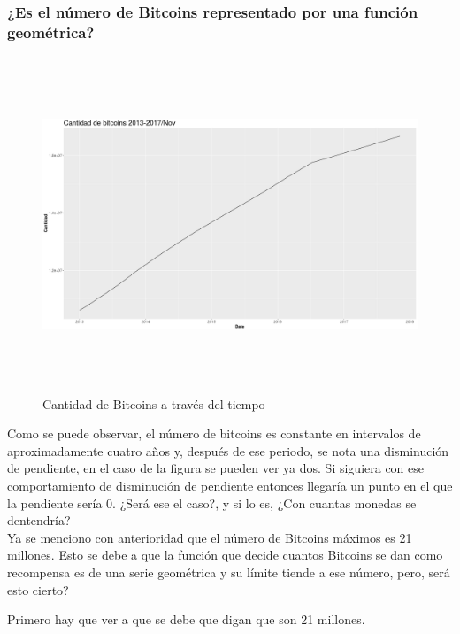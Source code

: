 \documentclass[12pt,letterpaper]{article}
\begin{document}
    \subsubsection*{¿Es el número de Bitcoins representado por una función geom\'etrica?}

    \begin{figure}
        \centering

        \includegraphics[width = 18cm, height = 10cm]{btc/fecha_vs_cantidad}

        \caption{Cantidad de Bitcoins a trav\'es del tiempo}
    \end{figure}

    Como se puede observar, el n\'umero de bitcoins es constante en intervalos de aproximadamente cuatro a\~nos y, despu\'es de ese periodo, se nota una disminuci\'on de pendiente, en el caso de la figura se pueden ver ya dos. Si siguiera con ese comportamiento de disminuci\'on de pendiente entonces llegar\'ia un punto en el que la pendiente ser\'ia 0. ¿Ser\'a ese el caso?, y si lo es, ¿Con cuantas monedas se dentendr\'ia?
    \\

    Ya se menciono con anterioridad que el n\'umero de Bitcoins m\'aximos es 21 millones. Esto se debe a que la funci\'on que decide cuantos Bitcoins se dan como recompensa es de una serie geom\'etrica y su l\'imite tiende a ese n\'umero, pero, ser\'a esto cierto? 

    Primero hay que ver a que se debe que digan que son 21 millones.
    \\
\end{document}
